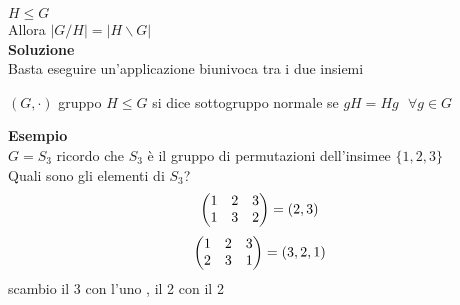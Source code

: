 \documentclass[12px]{article}
\begin{document}
{ $H\leq G$\\
 Allora  $|G/H| = |H\backslash G|$ \\
 \textbf{Soluzione}\\
 Basta eseguire un'applicazione biunivoca tra i due insiemi
 \begin{defi}
 	$(G,\cdot)$ gruppo $H\leq G$ si dice sottogruppo normale se  $gH = Hg \ \ \ \forall g\in G$
 \end{defi}
 \textbf{Esempio}\\
 $G=S_3$ ricordo che  $S_3$ è il gruppo di permutazioni dell'insimee $\lbrace 1,2,3\rbrace$\\
 Quali sono gli elementi di  $S_3$?\\
 \[
	 \begin{pmatrix}1&2&3\\1&3&2\end{pmatrix} = (2,3)
 \] 
 \[
	 \begin{pmatrix}1&2&3\\2&3&1\end{pmatrix} = (3,2,1)
 \] 
scambio il 3 con l'uno , il 2 con il 2\\


}
\end{document}
